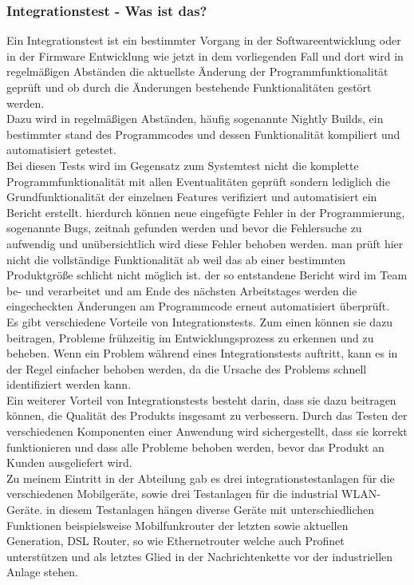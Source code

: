 \subsubsection{Integrationstest - Was ist das?}
Ein Integrationstest ist ein bestimmter Vorgang in der Softwareentwicklung oder in der Firmware Entwicklung wie jetzt in dem vorliegenden Fall und dort wird in regelmäßigen Abständen die aktuellste Änderung der Programmfunktionalität geprüft und ob durch die Änderungen bestehende Funktionalitäten gestört werden.  \\ 
Dazu wird in regelmäßigen Abständen, häufig sogenannte Nightly Builds,  ein bestimmter stand des Programmcodes und dessen Funktionalität kompiliert und automatisiert getestet. \\ 
Bei diesen Tests wird im Gegensatz zum Systemtest nicht die komplette Programmfunktionalität mit allen Eventualitäten geprüft sondern lediglich die Grundfunktionalität der einzelnen Features verifiziert und automatisiert ein Bericht erstellt. hierdurch können neue eingefügte Fehler in der Programmierung, sogenannte Bugs, zeitnah gefunden werden und bevor die Fehlersuche zu aufwendig und unübersichtlich wird diese Fehler behoben werden. man prüft hier nicht die vollständige Funktionalität ab weil das ab einer bestimmten Produktgröße schlicht nicht möglich ist. der so entstandene Bericht wird im Team be- und verarbeitet und am Ende des nächsten Arbeitstages werden die eingecheckten Änderungen am Programmcode erneut automatisiert überprüft.
 \\ Es gibt verschiedene Vorteile von Integrationstests. Zum einen können sie dazu beitragen, Probleme frühzeitig im Entwicklungsprozess zu erkennen und zu beheben. Wenn ein Problem während eines Integrationstests auftritt, kann es in der Regel einfacher behoben werden, da die Ursache des Problems schnell identifiziert werden kann.
\\
Ein weiterer Vorteil von Integrationstests besteht darin, dass sie dazu beitragen können, die Qualität des Produkts insgesamt zu verbessern. Durch das Testen der verschiedenen Komponenten einer Anwendung wird sichergestellt, dass sie korrekt funktionieren und dass alle Probleme behoben werden, bevor das Produkt an Kunden ausgeliefert wird.
\\
Zu meinem Eintritt in der Abteilung gab es drei  integrationstestanlagen für die verschiedenen Mobilgeräte, sowie drei Testanlagen für die industrial WLAN-Geräte.
 in diesem Testanlagen hängen diverse Geräte mit unterschiedlichen Funktionen beispielsweise Mobilfunkrouter der letzten sowie aktuellen Generation, DSL Router, so wie Ethernetrouter  welche auch Profinet unterstützen und als letztes Glied in der Nachrichtenkette vor der industriellen Anlage stehen.
